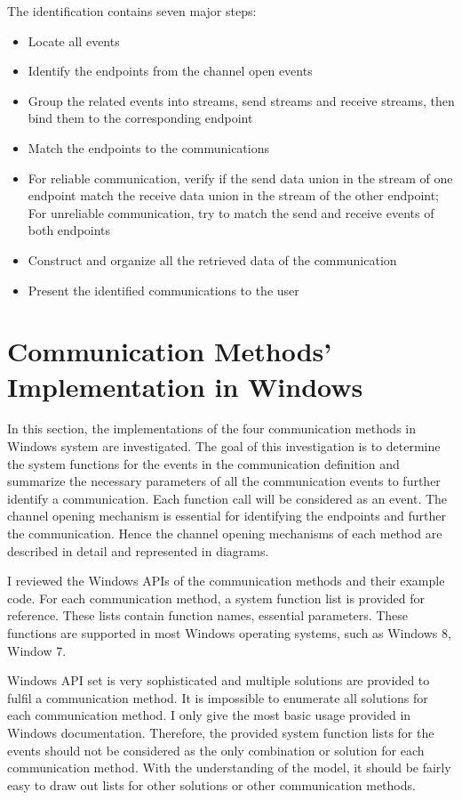 The identification contains seven major steps:
\begin{itemize}
 \item Locate all events
 \item Identify the endpoints from the channel open events
 \item Group the related events into streams, send streams and receive streams, then bind them to the corresponding endpoint
 \item Match the endpoints to the communications
 \item For reliable communication, verify if the send data union in the stream of one endpoint match the receive data union in the stream of the other endpoint; For unreliable communication, try to match the send and receive events of both endpoints 
 \item Construct and organize all the retrieved data of the communication 
 \item Present the identified communications to the user
\end{itemize}

\section{Communication Methods' Implementation in Windows}\label{windows}
In this section, the implementations of the four communication methods in Windows system are investigated. The goal of this investigation is to determine the system functions for the events in the communication definition and summarize the necessary parameters of all the communication events to further identify a communication. Each function call will be considered as an event. The channel opening mechanism is essential for identifying the endpoints and further the communication. Hence the channel opening mechanisms of each method are described in detail and represented in diagrams. 

I reviewed the Windows APIs of the communication methods and their example code. For each communication method, a system function list is provided for reference. These lists contain function names, essential parameters. These functions are supported in most Windows operating systems, such as Windows 8, Window 7. 

Windows API set is very sophisticated and multiple solutions are provided to fulfil a communication method. It is impossible to enumerate all solutions for each communication method. I only give the most basic usage provided in Windows documentation. Therefore, the provided system function lists for the events should not be considered as the only combination or solution for each communication method. With the understanding of the model, it should be fairly easy to draw out lists for other solutions or other communication methods. 

